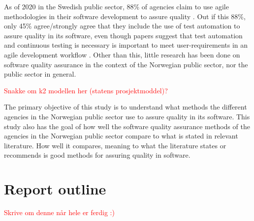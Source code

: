 As of 2020 in the Swedish public sector, 88\% of agencies claim to use agile methodologies in their software development to assure quality \cite{mb_2020}. Out if this 88\%, only 45\% agree/strongly agree that they include the use of test automation to assure quality in its software, even though papers suggest that test automation and continuous testing is necessary is important to meet user-requirements in an agile development workflow \cite{vk_2010}. Other than this, little research has been done on software quality assurance in the context of the Norwegian public sector, nor the public sector in general. 




\textcolor{red}{Snakke om k2 modellen her (statens prosjektmoddel)?} 

The primary objective of this study is to understand what methods the different agencies in the Norwegian public sector use to assure quality in its software. This study also has the goal of how well the software quality assurance methods of the agencies in the Norwegian public sector compare to what is stated in relevant literature. How well it compares, meaning to what the literature states or recommends is good methods for assuring quality in software. 

\section{Report outline}

\textcolor{red}{Skrive om denne når hele er ferdig :)}